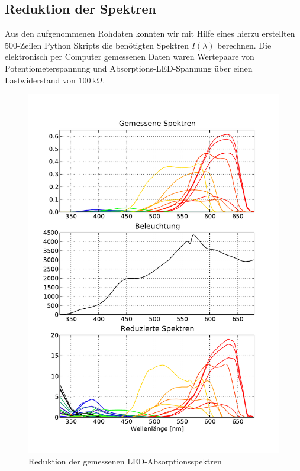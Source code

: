 \documentclass[11pt]{scrartcl}
\newcommand{\unit}[1]{\ensuremath{\,\mathrm{#1}}} %
\begin{document}
\subsection{Reduktion der Spektren}
Aus den aufgenommenen Rohdaten konnten wir mit Hilfe eines hierzu erstellten 500-Zeilen Python Skripts die benötigten Spektren $I(\lambda)$ berechnen.
Die elektronisch per Computer gemessenen Daten waren Wertepaare von Potentiometerspannung und Absorptions-LED-Spannung über einen Lastwiderstand von $100\unit{k\Omega}$.
\begin{figure}[h]
\begin{center}
\includegraphics[width=1\textwidth]{spektren_mit_halogen.pdf}
\end{center}
\vspace{-1.5\baselineskip}
\caption{Reduktion der gemessenen LED-Absorptionsspektren}
\label{fig:reduktion}
\end{figure}
\end{document}
